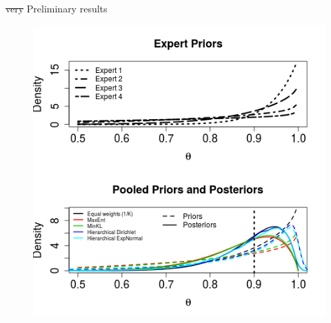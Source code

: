 \begin{frame}{\sout{very} Preliminary results}
\begin{figure}
 \begin{center}
  \includegraphics[scale=0.4]{figures/new_beta_example.png}
 \end{center}
\end{figure}
\end{frame}
